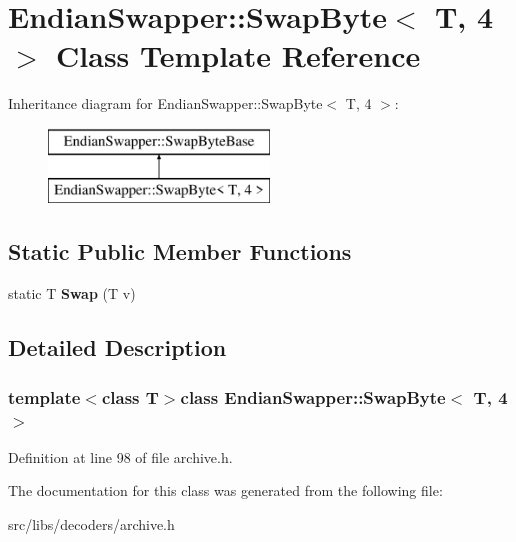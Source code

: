 \hypertarget{classEndianSwapper_1_1SwapByte_3_01T_00_014_01_4}{\section{Endian\-Swapper\-:\-:Swap\-Byte$<$ T, 4 $>$ Class Template Reference}
\label{classEndianSwapper_1_1SwapByte_3_01T_00_014_01_4}
}
Inheritance diagram for Endian\-Swapper\-:\-:Swap\-Byte$<$ T, 4 $>$\-:\begin{figure}[H]
\begin{center}
\leavevmode
\includegraphics[height=2.000000cm]{classEndianSwapper_1_1SwapByte_3_01T_00_014_01_4}
\end{center}
\end{figure}
\subsection*{Static Public Member Functions}
\begin{DoxyCompactItemize}
\item 
\hypertarget{classEndianSwapper_1_1SwapByte_3_01T_00_014_01_4_aa5319a7e5d4a1ad11c9d2c21398233d0}{static T {\bfseries Swap} (T v)}\label{classEndianSwapper_1_1SwapByte_3_01T_00_014_01_4_aa5319a7e5d4a1ad11c9d2c21398233d0}

\end{DoxyCompactItemize}


\subsection{Detailed Description}
\subsubsection*{template$<$class T$>$class Endian\-Swapper\-::\-Swap\-Byte$<$ T, 4 $>$}



Definition at line 98 of file archive.\-h.



The documentation for this class was generated from the following file\-:\begin{DoxyCompactItemize}
\item 
src/libs/decoders/archive.\-h\end{DoxyCompactItemize}
